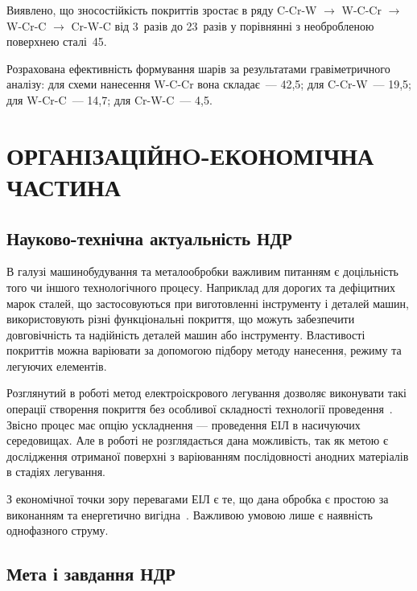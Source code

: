 \documentclass[a4paper,fontsize=14bp,ukrainian]{extreport}
\begin{document}
Виявлено, що зносостійкість покриттів зростає в ряду C-Cr-W $\rightarrow$ W-C-Cr $\rightarrow$ W-Cr-C $\rightarrow$ Cr-W-C від 3~разів до 23~разів у порівнянні з необробленою поверхнею сталі~45.

Розрахована ефективність формування шарів за результатами гравіметричного аналізу: для схеми нанесення W-C-Cr вона складає~--- 42,5; для C-Cr-W~--- 19,5; для W-Cr-C~--- 14,7; для Cr-W-C~--- 4,5.


\chapter{ОРГАНІЗАЦІЙНO-ЕКОНОМІЧНА ЧАСТИНА}
\label{chap:economics}

\section{Науково-технічна актуальність НДР}

В галузі машинобудування та металообробки важливим питанням є доцільність того чи іншого технологічного процесу. Наприклад для дорогих та дефіцитних марок сталей, що застосовуються при виготовленні інструменту і деталей машин, використовують різні функціональні покриття, що можуть забезпечити довговічність та надійність деталей машин або інструменту. Властивості покриттів можна варіювати за допомогою підбору методу нанесення, режиму та легуючих елементів.

Розглянутий в роботі метод електроіскрового легування дозволяє виконувати такі операції створення покриття без особливої складності технології проведення~\cite{hitlevich1985}. Звісно процес має опцію ускладнення --- проведення ЕІЛ в насичуючих середовищах. Але в роботі не розглядається дана можливість, так як метою є дослідження отриманої поверхні з варіюванням послідовності анодних матеріалів в стадіях легування.

З економічної точки зору перевагами ЕІЛ є те, що дана обробка є простою за виконанням та енергетично вигідна~\cite{liu2007}. Важливою умовою лише є наявність однофазного струму.

\section{Мета і завдання НДР}
\end{document}
